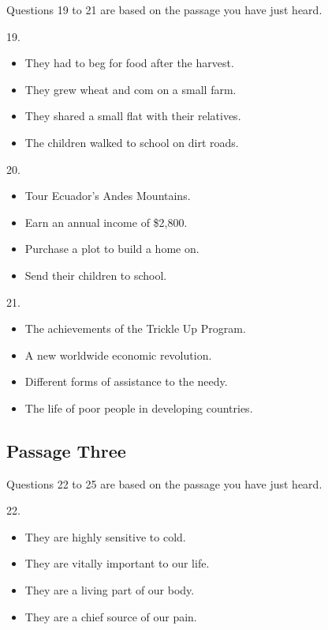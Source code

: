 \documentclass[UTF8,11pt]{ctexart}
\begin{document}
Questions 19 to 21 are based on the passage you have just heard.


19.


\begin{itemize}[leftmargin=2em,itemsep=.2em,topsep=.4em]\item[A.] They had to beg for food after the harvest.
\item[B.] They grew wheat and com on a small farm.
\item[C.] They shared a small flat with their relatives.
\item[D.] The children walked to school on dirt roads.
\end{itemize}

20.


\begin{itemize}[leftmargin=2em,itemsep=.2em,topsep=.4em]\item[A.] Tour Ecuador’s Andes Mountains.
\item[B.] Earn an annual income of \$2,800.
\item[C.] Purchase a plot to build a home on.
\item[D.] Send their children to school.
\end{itemize}

21.


\begin{itemize}[leftmargin=2em,itemsep=.2em,topsep=.4em]\item[A.] The achievements of the Trickle Up Program.
\item[B.] A new worldwide economic revolution.
\item[C.] Different forms of assistance to the needy.
\item[D.] The life of poor people in developing countries.
\end{itemize}

\subsection*{\textbf{Passage Three}}


Questions 22 to 25 are based on the passage you have just heard.


22.


\begin{itemize}[leftmargin=2em,itemsep=.2em,topsep=.4em]\item[A.] They are highly sensitive to cold.
\item[B.] They are vitally important to our life.
\item[C.] They are a living part of our body.
\item[D.] They are a chief source of our pain.
\end{itemize}
\end{document}
